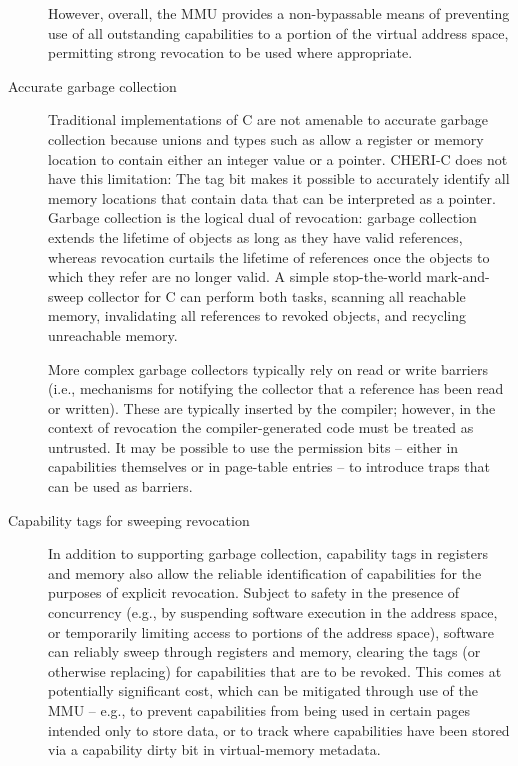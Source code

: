 \begin{description}
  However, overall, the MMU provides a non-bypassable means of preventing use
  of all outstanding capabilities to a portion of the virtual address space,
  permitting strong revocation to be used where appropriate.

\item[Accurate garbage collection]
  Traditional implementations of C are not amenable to accurate garbage
  collection because unions and types such as  allow a register
  or memory location to contain either an integer value or a pointer.
  CHERI-C does not have this limitation: The tag bit makes it possible to
  accurately identify all memory locations that contain data that can be
  interpreted as a pointer.
  Garbage collection is the logical dual of revocation: garbage collection
  extends the lifetime of objects as long as they have valid references, whereas
  revocation curtails the lifetime of references once the objects to which they
  refer are no longer valid.
  A simple stop-the-world mark-and-sweep collector for C can perform both tasks,
  scanning all reachable memory, invalidating all references to revoked objects, and recycling unreachable memory.

  More complex garbage collectors typically rely on read or write barriers
  (i.e., mechanisms for notifying the collector that a reference has been read or
  written).
  These are typically inserted by the compiler; however, in the context of revocation
  the compiler-generated code must be treated as untrusted.
  It may be possible to use the permission bits -- either in capabilities
  themselves or in page-table entries -- to introduce traps that can be used as
  barriers.

\item[Capability tags for sweeping revocation]
  In addition to supporting garbage collection, capability tags in registers
  and memory also allow the reliable identification of capabilities for the
  purposes of explicit revocation.
  Subject to safety in the presence of concurrency (e.g., by suspending
  software execution in the address space, or temporarily limiting
  access to portions of the address space), software can reliably
  sweep through registers and memory, clearing the tags (or otherwise
  replacing)
for
 capabilities that are to be revoked.
  This comes at potentially significant cost, which can be mitigated through
  use of the MMU -- e.g., to prevent capabilities from being used in certain
  pages intended only to store data, or to track where capabilities have been
  stored via a capability dirty bit in virtual-memory metadata.


\end{description}
